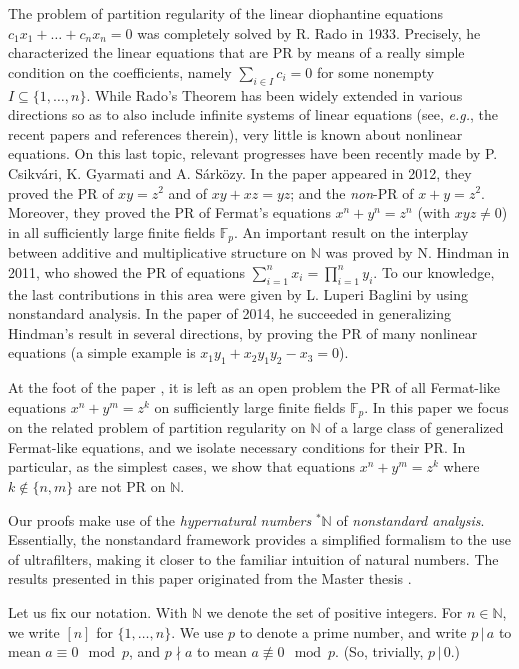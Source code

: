 \documentclass[11pt]{amsart}
\theoremstyle{definition}
\theoremstyle{remark}
\numberwithin{equation}{section}
\begin{document}
\smallskip
The problem of partition regularity of
the linear diophantine equations $c_1x_1+\ldots+c_n x_n=0$
was completely solved by R. Rado \cite{R33} in 1933.
Precisely, he characterized the linear equations that are PR
by means of a really simple condition on the coefficients,
namely $\sum_{i\in I}c_i=0$ for some nonempty 
$I\subseteq\{1,\ldots,n\}$.
While Rado's Theorem has been widely extended
in various directions so as to
also include infinite systems of linear equations
(see, \emph{e.g.}, the recent papers \cite{GHL14,BHLS15,HLS15}
and references therein),
very little is known about nonlinear equations.
On this last topic, relevant progresses have been recently
made by P. Csikv\'ari, K. Gyarmati and A. S\'ark\"{o}zy.
In the paper \cite{CGS12} appeared in 2012, they
proved the PR of 
$xy=z^2$ and of $xy+xz=yz$; and the \emph{non}-PR
of $x+y=z^2$. Moreover, they proved the PR of
Fermat's equations $x^n+y^n=z^n$ (with $xyz\ne 0$)
in all sufficiently large finite fields $\mathbb{F}_p$.
An important result on the interplay
between additive and multiplicative structure on ${\mathbb{N}}$
was proved by N. Hindman \cite{H11} in 2011,
who showed the PR of
equations $\sum_{i=1}^n x_i=\prod_{i=1}^n y_i$.
To our knowledge, the last contributions
in this area were given by L. Luperi Baglini
by using nonstandard analysis.
In the paper \cite{LB14} of 2014, he
succeeded in generalizing
Hindman's result in several directions, by 
proving the PR of many
nonlinear equations (a simple example is $x_1y_1+x_2 y_1y_2-x_3=0$).

At the foot of the paper \cite{CGS12}, it is left as an open 
problem the PR of all Fermat-like
equations $x^n+y^m=z^k$ on
sufficiently large finite fields $\mathbb{F}_p$.
In this paper we focus on the related
problem of partition regularity on ${\mathbb{N}}$ of
a large class of generalized Fermat-like equations,
and we isolate necessary conditions for their PR.
In particular, as the simplest cases, we show that
equations $x^n+y^m=z^k$ where $k\notin\{n,m\}$
are not PR on ${\mathbb{N}}$. 

\smallskip
Our proofs make use of the \emph{hypernatural numbers} ${{{}^*{\mathbb{N}}}}$ of 
\emph{nonstandard analysis}.
Essentially, the nonstandard framework provides a simplified
formalism to the use of ultrafilters, making it closer to the familiar
intuition of natural numbers. The results presented in this paper 
originated from the Master thesis \cite{Ri16}.

\smallskip
Let us fix our notation.
With ${\mathbb{N}}$ we denote the set of positive integers.
For $n\in{\mathbb{N}}$, we write $[n]$ for $\{1,\ldots,n\}$. 
We use $p$ to denote a prime number, and write 
$p{\,|\,} a$ to mean $a\equiv 0\!\mod p$,
and $p{\nmid} a$ to mean $a\not\equiv 0\!\mod p$.
(So, trivially, $p{\,|\,} 0$.)
\end{document}
